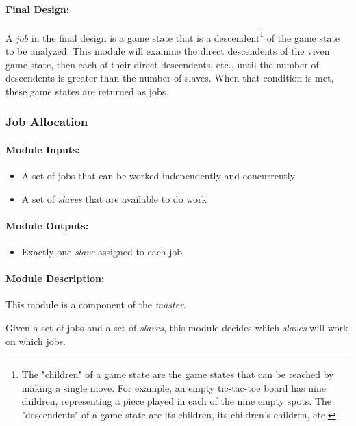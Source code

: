 \documentclass[pdftex,12pt,a4paper]{article}
\begin{document}
\paragraph{Final Design:\\}
A \emph{job} in the final design is a game state that is a descendent\footnote{The "children" of a game state are the game states that can be reached by making a single move. For example, an empty tic-tac-toe board has nine children, representing a piece played in each of the nine empty spots. The "descendents" of a game state are its children, its children's children, etc.} of the game state to be analyzed. This module will examine the direct descendents of the viven game state, then each of their direct descendents, etc., until the number of descendents is greater than the number of slaves. When that condition is met, these game states are returned as jobs.


\subsubsection{Job Allocation}\label{sec:job-allocation}

\paragraph{Module Inputs:}
\begin{itemize}
\item A set of jobs that can be worked independently and concurrently
\item A set of \emph{slaves} that are available to do work
\end{itemize}

\paragraph{Module Outputs:}
\begin{itemize}
\item Exactly one \emph{slave} assigned to each job
\end{itemize}

\paragraph{Module Description:\\}
This module is a component of the \emph{master}.

Given a set of jobs and a set of \emph{slaves}, this module decides which \emph{slaves} will work on which jobs.
\end{document}
